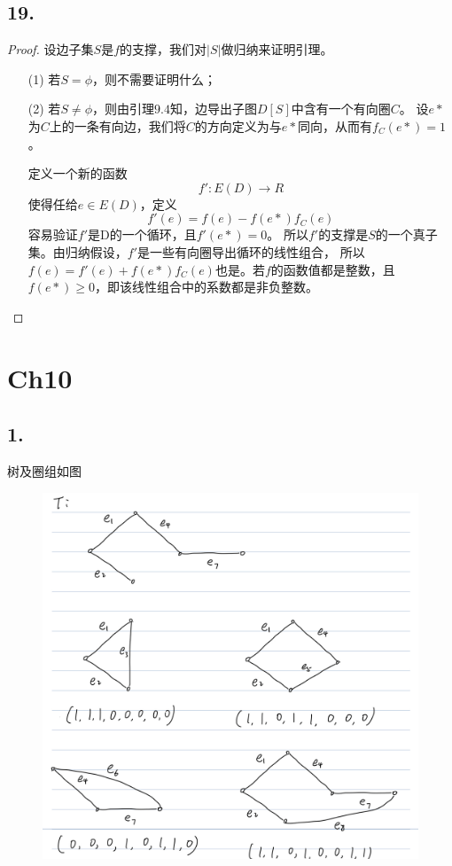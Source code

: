 \documentclass{article}
\begin{document}
\subsection*{19.}
\begin{proof}
        设边子集$S$是$f$的支撑，我们对$|S|$做归纳来证明引理。
        \begin{enumerate}
            \item [(1)]若$S=\phi$，则不需要证明什么；
            \item [(2)]若$S\neq \phi$，则由引理$9.4$知，边导出子图$D[S]$中含有一个有向圈$C$。
            设$e*$为$C$上的一条有向边，我们将$C$的方向定义为与$e*$同向，从而有$f_{C} (e*)=1$。

            定义一个新的函数
            \[
                f' : E(D) \rightarrow R
            \]
            使得任给$e\in E(D)$，定义
            \[
                f'(e) = f(e) - f(e*) f_C(e)
            \] 
            容易验证$f'$是D的一个循环，且$f'(e*)=0$。
            所以$f'$的支撑是$S$的一个真子集。由归纳假设，$f'$是一些有向圈导出循环的线性组合，
            所以$f(e)=f'(e)+f(e*)f_{C}(e)$也是。若$f$的函数值都是整数，且$f(e*)\geq 0$，即该线性组合中的系数都是非负整数。
        \end{enumerate}
\end{proof}

\section*{Ch10}
\subsection*{1.}
树及圈组如图
\begin{figure}[htbp]
    \centering
    \includegraphics[scale=0.2]{1.PNG}
\end{figure}
\end{document}
